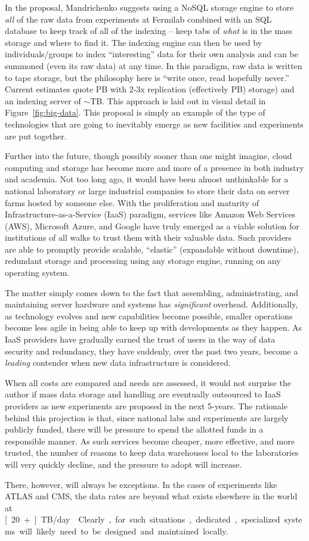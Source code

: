 In the proposal, Mandrichenko suggests using a NoSQL storage engine to store \emph{all} of the raw data from experiments at Fermilab combined with an SQL database to keep track of all of the indexing -- keep tabs of \emph{what} is in the mass storage and where to find it. The indexing engine can then be used by individuals/groups to index ``interesting'' data for their own analysis and can be summoned (even its raw data) at any time. In this paradigm, raw data is written to tape storage, but the philosophy here is ``write once, read hopefully never.'' Current estimates quote \unit[5]{PB} with 2-3x replication (effectively \unit[2]{PB}) storage) and an indexing server of $\sim$\unit[100]{TB}. This approach is laid out in visual detail in Figure~\ref{fig:big-data}. This proposal is simply an example of the type of technologies that are going to inevitably emerge as new facilities and experiments are put together.

Further into the future, though possibly sooner than one might imagine, cloud computing and storage has become more and more of a presence in both industry and academia. Not too long ago, it would have been almost unthinkable for a national laboratory or large industrial companies to store their data on server farms hosted by someone else. With the proliferation and maturity of Infrastructure-as-a-Service (IaaS) paradigm, services like Amazon Web Services (AWS), Microsoft Azure, and Google have truly emerged as a viable solution for institutions of all walks to trust them with their valuable data. Such providers are able to promptly provide scalable, ``elastic'' (expandable without downtime), redundant storage and processing using any storage engine, running on any operating system.

The matter simply comes down to the fact that assembling, administrating, and maintaining server hardware and systems has \emph{significant} overhead. Additionally, as technology evolves and new capabilities become possible, smaller operations become less agile in being able to keep up with developments as they happen. As IaaS providers have gradually earned the trust of users in the way of data security and redundancy, they have suddenly, over the past two years, become a \emph{leading} contender when new data infrastructure is considered.

When all costs are compared and needs are assessed, it would not surprise the author if mass data storage and handling are eventually outsourced to IaaS providers as new experiments are proposed in the next 5-\unit[10]{years}. The rationale behind this projection is that, since national labs and experiments are largely publicly funded, there will be pressure to spend the allotted funds in a responsible manner. As such services become cheaper, more effective, and more trusted, the number of reasons to keep data warehouses local to the laboratories will very quickly decline, and the pressure to adopt will increase.

There, however, will always be exceptions. In the cases of experiments like ATLAS and CMS, the data rates are beyond what exists elsewhere in the world at \unit[20+]{TB/day}~\cite{Andre:2015jty}. Clearly, for such situations, dedicated, specialized systems will likely need to be designed and maintained locally.
